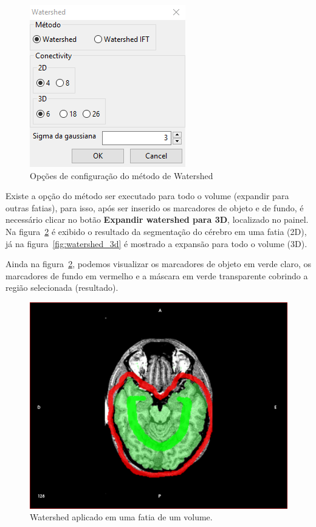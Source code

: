\begin{figure}[!htb]
\centering
\includegraphics[scale=0.55]{../user_guide_figures/invesalius_screen/segmentation_watershed_conf_pt.png}
\caption{Opções de configuração do método de Watershed}
\label{fig:watershed_janela_conf}
\end{figure}

Existe a opção do método ser executado para todo o volume (expandir para outras fatias), para isso, após ser inserido os marcadores de objeto e de fundo, é necessário clicar no botão \textbf{Expandir watershed para 3D}, localizado no painel. Na figura~\ref{fig:watershed_2d} é exibido o resultado da segmentação do cérebro em uma fatia (2D), já na figura~\ref{fig:watershed_3d} é mostrado a expansão para todo o volume (3D). 

Ainda na figura~\ref{fig:watershed_2d}, podemos visualizar os marcadores de objeto em verde claro, os marcadores de fundo em vermelho e a máscara em verde transparente cobrindo a região selecionada (resultado).

\begin{figure}[!htb]
\centering
\includegraphics[scale=0.2]{../user_guide_figures/invesalius_screen/segmentation_watershed_axial.png}
\caption{Watershed aplicado em uma fatia de um volume.}
\label{fig:watershed_2d}
\end{figure}

